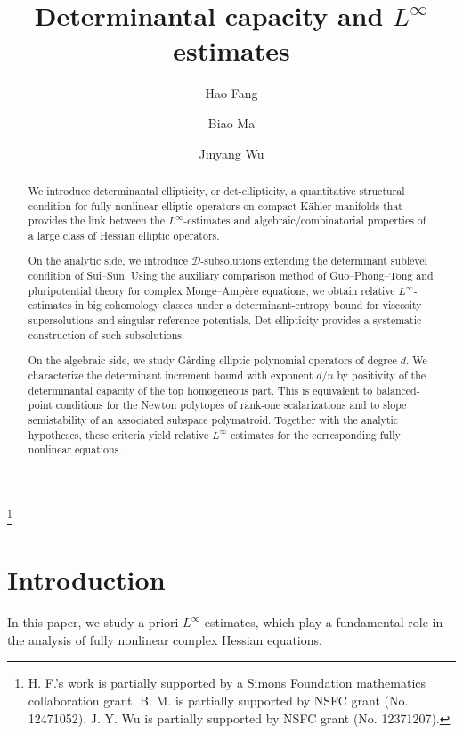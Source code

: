 \documentclass[oneside,english,letterpaper]{amsart}
\title {Determinantal capacity and $L^\infty$ estimates}
\numberwithin{equation}{section}
\theoremstyle{plain}
\theoremstyle{definition}
\theoremstyle{remark}
\begin{document}
\author{Hao Fang}
\address{Department of Mathematics, University of Iowa, Iowa City, IA 52246,
USA}
\author{Biao Ma}
\address{School of Mathematical Sciences, East China Normal University, 500
Dongchuan Road, Shanghai, China.}
\thanks{H. F.'s work is partially supported by a Simons Foundation mathematics
collaboration grant. B. M. is partially supported
by NSFC grant (No. 12471052). J. Y. Wu is partially supported by NSFC grant (No. 12371207).
}

\author{Jinyang Wu}
\address{Institute of Mathematical Sciences (IMS), ShanghaiTech University, 393 Middle Huaxia Road, Shanghai, China}

\begin{abstract}
We introduce determinantal ellipticity, or det-ellipticity, a quantitative structural
condition for fully nonlinear elliptic operators on compact K\"ahler
manifolds that provides the link between
the $L^\infty$-estimates and algebraic/combinatorial properties of a large class of Hessian elliptic operators.

On the analytic side, we introduce $\mathcal D$-subsolutions extending the determinant sublevel condition of Sui--Sun.  Using the auxiliary comparison method of Guo--Phong--Tong
and pluripotential theory for complex Monge--Amp\`ere equations, we obtain relative $L^\infty$-estimates in big cohomology classes under a determinant-entropy bound for viscosity supersolutions and singular reference potentials. Det-ellipticity
provides a systematic construction of such subsolutions.

On the algebraic side, we study G{\aa}rding elliptic polynomial
operators of degree $d$. We characterize the determinant increment
bound with exponent $d/n$ by positivity of the determinantal capacity
of the top homogeneous part. This is equivalent to balanced-point
conditions for the Newton polytopes of rank-one scalarizations and
to slope semistability of an associated subspace polymatroid.
Together with the analytic hypotheses, these criteria yield relative
$L^\infty$ estimates for the corresponding fully nonlinear equations.
\end{abstract}
\maketitle

\section{Introduction}
\label{sec:introduction}
In this paper, we study a priori $L^\infty$ estimates, which play a fundamental role in the analysis of fully nonlinear complex Hessian equations.
\end{document}
